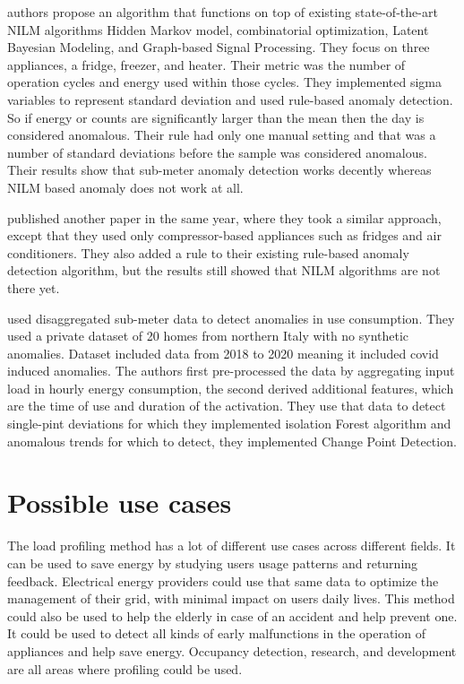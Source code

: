 \documentclass[
11pt, %
english, %
singlespacing, %
headsepline, %
]{MastersDoctoralThesis} %
\begin{document}
\cite{NILMAD2019} authors propose an algorithm
that functions on top of existing state-of-the-art NILM algorithms Hidden Markov model,
combinatorial optimization, Latent Bayesian Modeling, and Graph-based Signal Processing.
They focus on three appliances, a fridge, freezer, and heater. Their metric was the number of operation cycles and energy used within those cycles. 
They implemented sigma variables to represent standard deviation and used rule-based anomaly detection.
So if energy or counts are significantly larger than the mean then the day is considered anomalous.
Their rule had only one manual setting and that was a number of standard deviations before the sample was considered anomalous.
Their results show that sub-meter anomaly detection works decently whereas NILM based anomaly does not work at all. 

\cite{NILMAD22019} published another paper in the same year, where they took a similar approach, except that they used 
only compressor-based appliances such as fridges and air conditioners. They also added a rule to their existing rule-based anomaly 
detection algorithm, but the results still showed that NILM algorithms are not there yet. 

\cite{Castangia2021} used disaggregated sub-meter data to detect anomalies in use consumption.
They used a private dataset of 20 homes from northern Italy with no synthetic anomalies. 
Dataset included data from 2018 to 2020 meaning it included covid induced anomalies. 
The authors first pre-processed the data by aggregating input load in hourly energy consumption, 
the second derived additional features, which are the time of use and duration of the activation.
They use that data to detect single-pint deviations for which they implemented isolation Forest algorithm and
anomalous trends for which to detect, they implemented Change Point Detection. 

\chapter{Possible use cases}

The load profiling method has a lot of different use cases across different fields.
It can be used to save energy by studying users usage patterns and returning feedback.
Electrical energy providers could use that same data to optimize the management of their grid, with minimal impact on users daily lives.
This method could also be used to help the elderly in case of an accident and help prevent one. 
It could be used to detect all kinds of early malfunctions in the operation of appliances and help save energy.
Occupancy detection, research, and development are all areas where profiling could be used. 
\end{document}
